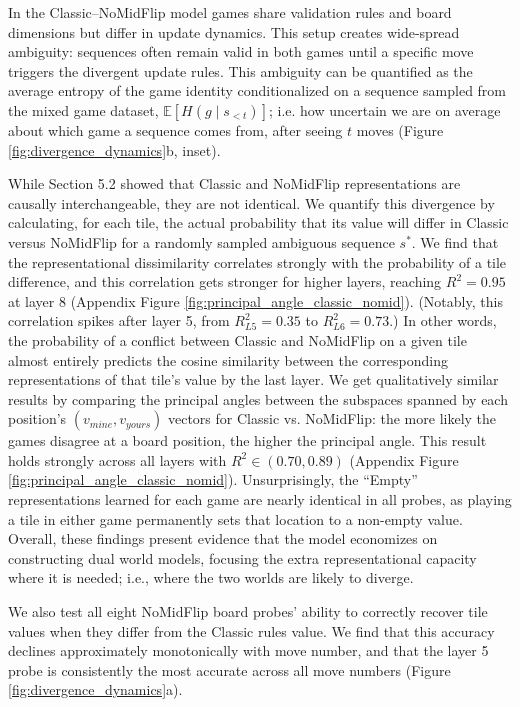 \documentclass{article}
\theoremstyle{plain}
\theoremstyle{definition}
\theoremstyle{remark}
\begin{document}
In the Classic--NoMidFlip model games share validation rules and board dimensions but differ in update dynamics. This setup creates wide-spread ambiguity: sequences often remain valid in both games until a specific move triggers the divergent update rules. This ambiguity can be quantified as the average entropy of the game identity conditionalized on a sequence sampled from the mixed game dataset,  $\mathbb{E}[H(g \mid s_{<t})]$; i.e. how uncertain we are on average about which game a sequence comes from, after seeing $t$ moves (Figure \ref{fig:divergence_dynamics}b, inset).

While Section 5.2 showed that Classic and NoMidFlip representations are causally interchangeable, they are not identical. We quantify this divergence by calculating, for each tile, the actual probability that its value will differ in Classic versus NoMidFlip for a randomly sampled ambiguous sequence $s^*$. We find that the representational dissimilarity correlates strongly with the probability of a tile difference, and this correlation gets stronger for higher layers, reaching $R^2 = 0.95$ at layer 8 (Appendix Figure \ref{fig:principal_angle_classic_nomid}). (Notably, this correlation spikes after layer 5, from $R^2_{L5} = 0.35$ to $R^2_{L6} = 0.73$.) In other words, the probability of a conflict between Classic and NoMidFlip on a given tile almost entirely predicts the cosine similarity between the corresponding representations of that tile's value by the last layer. We get qualitatively similar results by comparing the principal angles between the subspaces spanned by each position's $(v_{mine}, v_{yours})$ vectors for Classic vs. NoMidFlip: the more likely the games disagree at a board position, the higher the principal angle. This result holds strongly across all layers with $R^2 \in (0.70, 0.89)$ (Appendix Figure \ref{fig:principal_angle_classic_nomid}). Unsurprisingly, the ``Empty'' representations learned for each game are nearly identical in all probes, as playing a tile in either game permanently sets that location to a non-empty value. Overall, these findings present evidence that the model economizes on constructing dual world models, focusing the extra representational capacity where it is needed; i.e., where the two worlds are likely to diverge.

We also test all eight NoMidFlip board probes' ability to correctly recover tile values when they differ from the Classic rules value. We find that this accuracy declines approximately monotonically with move number, and that the layer 5 probe is consistently the most accurate across all move numbers (Figure \ref{fig:divergence_dynamics}a).
\end{document}
